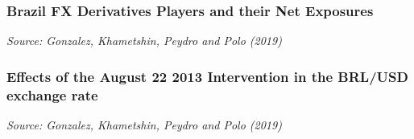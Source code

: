 \documentclass{beamer}
\begin{document}
\begin{frame}
  \frametitle{Brazil FX Derivatives Players and their Net Exposures}
  \medskip
  \emph{Source: Gonzalez, Khametshin, Peydro and Polo (2019)}
\end{frame}


\begin{frame}
  \frametitle{Effects of the August 22 2013 Intervention in the BRL/USD exchange rate}
  \medskip
  \emph{Source: Gonzalez, Khametshin, Peydro and Polo (2019)}

\end{frame}
\end{document}
